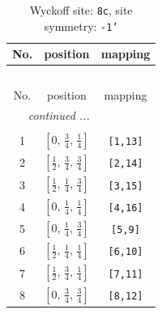 \documentclass[fleqn,8pt]{jsarticle}
\begin{document}
\renewcommand{\arraystretch}{1.2}
\begin{longtable}{ccc}
\caption{Wyckoff site: {\tt 8c}, site symmetry: {\tt -1'}}
 \\
 \hline \hline
No. & position & mapping \\ \hline \endfirsthead

\multicolumn{2}{l}{\tablename\ \thetable{}} \\
 \hline \hline
No. & position & mapping \\ \hline \endhead

 \hline \hline
\multicolumn{2}{r}{\footnotesize\it continued ...} \\ \endfoot

 \hline \hline
\multicolumn{2}{r}{} \\ \endlastfoot

1 & $\left[ 0,\, \frac{3}{4},\, \frac{1}{4} \right]$ & {\tt [1,13]} \\ \hline
2 & $\left[ \frac{1}{2},\, \frac{3}{4},\, \frac{3}{4} \right]$ & {\tt [2,14]} \\ \hline
3 & $\left[ \frac{1}{2},\, \frac{1}{4},\, \frac{3}{4} \right]$ & {\tt [3,15]} \\ \hline
4 & $\left[ 0,\, \frac{1}{4},\, \frac{1}{4} \right]$ & {\tt [4,16]} \\ \hline
5 & $\left[ 0,\, \frac{1}{4},\, \frac{3}{4} \right]$ & {\tt [5,9]} \\ \hline
6 & $\left[ \frac{1}{2},\, \frac{1}{4},\, \frac{1}{4} \right]$ & {\tt [6,10]} \\ \hline
7 & $\left[ \frac{1}{2},\, \frac{3}{4},\, \frac{1}{4} \right]$ & {\tt [7,11]} \\ \hline
8 & $\left[ 0,\, \frac{3}{4},\, \frac{3}{4} \right]$ & {\tt [8,12]} \\
\end{longtable}
\renewcommand{\arraystretch}{1.2}
\end{document}
